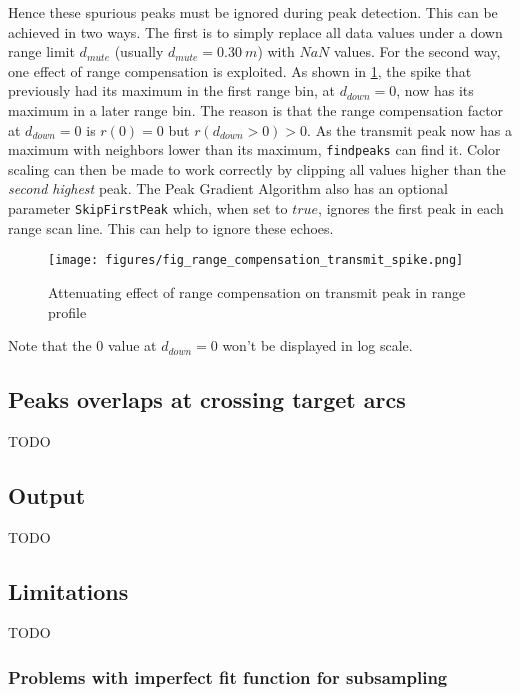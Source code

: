 Hence these spurious peaks must be ignored during peak detection. This
can be achieved in two ways. The first is to simply replace all data
values under a down range limit \(d_{mute}\) (usually
\(d_{mute}=\SI{0.30}{m}\)) with \(NaN\) values. For the second way, one effect
of range compensation is exploited. As shown in \cref{fig:fig_range_compensation_transmit_spike}, the spike
that previously had its maximum in the first range bin, at
\(d_{down}=0\), now has its maximum in a later range bin. The reason is
that the range compensation factor at \(d_{down}=0\) is \(r(0) = 0\) but
\(r(d_{down}>0) > 0\). As the transmit peak now has a maximum with
neighbors lower than its maximum, \texttt{findpeaks} can find it. Color
scaling can then be made to work correctly by clipping all values higher
than the \emph{second highest} peak. The Peak Gradient Algorithm also
has an optional parameter \texttt{SkipFirstPeak} which, when set to
\(true\), ignores the first peak in each range scan line. This can help
to ignore these echoes.

\begin{figure}[htbp]
    \centering
    \texttt{[image: figures/fig\_range\_compensation\_transmit\_spike.png]}
    \caption{Attenuating effect of range compensation on transmit peak in range profile}
    \label{fig:fig_range_compensation_transmit_spike}
\end{figure}

Note that the \(0\) value at \(d_{down}=0\) won't be displayed in log
scale.

\subsection{Peaks overlaps at crossing target arcs}\label{peaks-overlaps-at-crossing-target-arcs}

TODO

\subsection{Output}\label{output}

TODO

\subsection{Limitations}\label{limitations-1}

TODO

\subsubsection{Problems with imperfect fit function for subsampling}\label{problems-with-imperfect-fit-function-for-subsampling}


